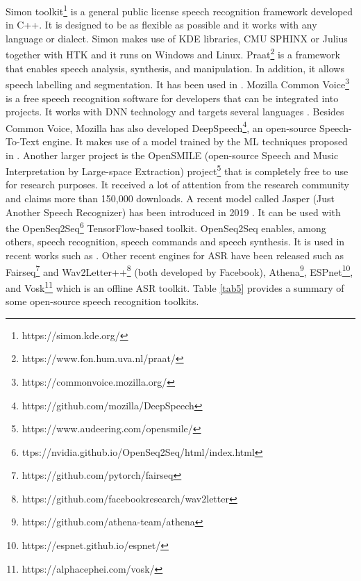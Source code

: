 Simon toolkit\footnote{https://simon.kde.org/ } is a general public license speech recognition framework developed in C++. It is designed to be as flexible as possible and it works with any language or dialect. Simon makes use of KDE libraries, CMU SPHINX or Julius together with HTK and it runs on Windows and Linux.
Praat\footnote{https://www.fon.hum.uva.nl/praat/} is a framework that enables speech analysis, synthesis, and manipulation. In addition, it allows speech labelling and segmentation. It has been used in .
Mozilla Common Voice\footnote{https://commonvoice.mozilla.org/ 
} is a free speech recognition software for developers that can be integrated into projects. It works with DNN technology and targets several languages . Besides Common Voice, Mozilla has also developed DeepSpeech\footnote{https://github.com/mozilla/DeepSpeech}, an open-source Speech-To-Text engine. It makes use of a model trained by the ML techniques proposed in . 
Another larger project is the OpenSMILE (open-source Speech and Music Interpretation by Large-space Extraction) project\footnote{https://www.audeering.com/opensmile/} that is completely free to use for research purposes. It received a lot of attention from the research community and claims more than 150,000 downloads. 
A recent model called Jasper (Just Another Speech Recognizer) has been introduced in 2019 . It can be used with the OpenSeq2Seq\footnote{ttps://nvidia.github.io/OpenSeq2Seq/html/index.html} TensorFlow-based toolkit. OpenSeq2Seq enables, among others, speech recognition, speech commands and speech synthesis. It is used in recent works such as .
Other recent engines for ASR have been released such as Fairseq\footnote{https://github.com/pytorch/fairseq} and Wav2Letter++\footnote{https://github.com/facebookresearch/wav2letter} (both developed by Facebook), Athena\footnote{https://github.com/athena-team/athena}, ESPnet\footnote{https://espnet.github.io/espnet/}, and Vosk\footnote{https://alphacephei.com/vosk/} which is an offline ASR toolkit. Table \ref{tab5} provides a summary of some open-source speech recognition toolkits.
